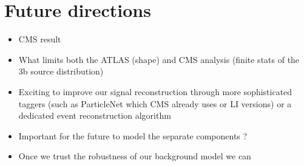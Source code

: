 \section{Future directions}
\label{sec:future directions}

\begin{itemize}
	\item CMS result
	\item What limits both the ATLAS (shape) and CMS analysis (finite stats of the 3b source distribution)
	\item Exciting to improve our signal reconstruction through more sophisticated taggers (such as ParticleNet which CMS already uses or LI versions) or a dedicated event reconstruction algorithm
	\item Important for the future to model the separate components ?
	\item Once we trust the robustness of our background model we can
\end{itemize}

